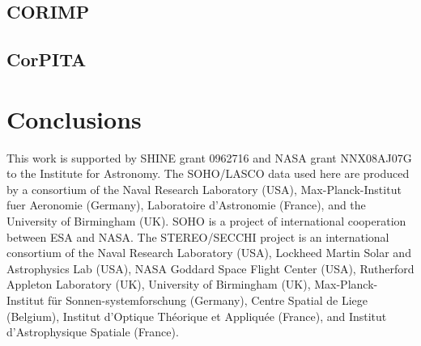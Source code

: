 \documentclass[structabstract]{aa}
\begin{document}
\subsection{CORIMP}
\label{subsect:corimp}

\subsection{CorPITA}
\label{subsect:corpita}

\section{Conclusions}
\label{sect:conclusions}


\begin{acknowledgements}
This work is supported by SHINE grant 0962716 and NASA grant NNX08AJ07G to the Institute for Astronomy. The SOHO/LASCO data used here are produced by a consortium of the Naval Research Laboratory (USA), Max-Planck-Institut fuer Aeronomie (Germany), Laboratoire d'Astronomie (France), and the University of Birmingham (UK). SOHO is a project of international cooperation between ESA and NASA. The STEREO/SECCHI project is an international consortium of the Naval Research Laboratory (USA), Lockheed Martin Solar and Astrophysics Lab (USA), NASA Goddard Space Flight Center (USA), Rutherford Appleton Laboratory (UK), University of Birmingham (UK), Max-Planck-Institut f\"{u}r Sonnen-systemforschung (Germany), Centre Spatial de Liege (Belgium), Institut d'Optique Th\'{e}orique et Appliqu\'{e}e (France), and Institut d'Astrophysique Spatiale (France). 
\end{acknowledgements}




  
\end{document}
